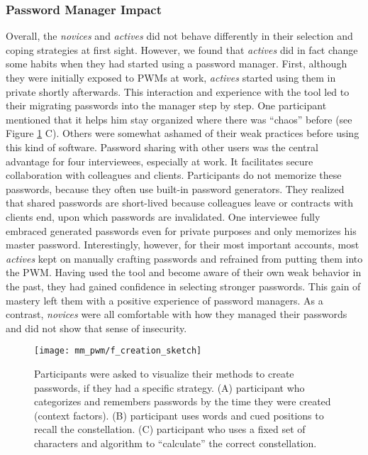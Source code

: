 \subsubsection{Password Manager Impact}
Overall, the \textit{novices} and \textit{actives} did not behave differently in their selection and coping strategies at first sight. However, we found that \textit{actives} did in fact change some habits when they had started using a password manager. First, although they were initially exposed to \glspl{PWM} at work, \textit{actives} started using them in private shortly afterwards. This interaction and experience with the tool led to their migrating passwords into the manager step by step. One participant mentioned that it helps him stay organized where there was ``chaos'' before (see Figure \ref{fig:mm_pwm:creation-strategies} C). Others were somewhat ashamed of their weak practices before using this kind of software. 
Password sharing with other users was the central advantage for four interviewees, especially at work. It facilitates secure collaboration with colleagues and clients. Participants do not memorize these passwords, because they often use built-in password generators. They realized that shared passwords are short-lived because colleagues leave or contracts with clients end, upon which passwords are invalidated. One interviewee fully embraced generated passwords even for private purposes and only memorizes his master password. Interestingly, however, for their most important accounts, most \textit{actives} kept on manually crafting passwords and refrained from putting them into the \gls{PWM}. Having used the tool and become aware of their own weak behavior in the past, they had gained confidence in selecting stronger passwords. This gain of mastery left them with a positive experience of password managers. As a contrast, \textit{novices} were all comfortable with how they managed their passwords and did not show that sense of insecurity.

\begin{figure}
\centering
\texttt{[image: mm\_pwm/f\_creation\_sketch]}
\caption{\label{fig:mm_pwm:creation-strategies}	Participants were asked to visualize their methods to create passwords, if they had a specific strategy. (A) participant who categorizes and remembers passwords by the time they were created (context factors). (B) participant uses words and cued positions to recall the constellation. (C) participant who uses a fixed set of characters and algorithm to ``calculate'' the correct constellation.}
\end{figure}

